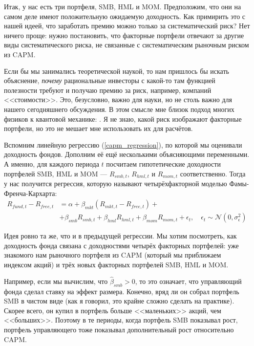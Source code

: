 Итак, у нас есть три портфеля, SMB, HML и MOM. Предположим, что они на самом деле имеют положительную ожидаемую доходность. Как примирить это с нашей идеей, что заработать премию можно только за систематический риск? Нет ничего проще: нужно постановить, что факторные портфели отвечают за другие виды систематического риска, не связанные с систематическим рыночным риском из CAPM.

Если бы мы занимались теоретической наукой, то нам пришлось бы искать объяснение, \emph{почему} рациональные инвесторы с какой-то там функцией полезности требуют и получаю премию за риск, например, компаний <<стоимости>>. Это, безусловно, важно для науки, но не столь важно для нашего сегодняшнего обсуждения. В этом смысле мне близок подход многих физиков к квантовой механике: . Я не знаю, какой риск изображают факторные портфели, но это не мешает мне использовать их для расчётов.

Вспомним линейную регрессию (\ref{capm_regression}), по которой мы оценивали доходность фондов. Дополним её ещё несколькими объясняющими переменными. А именно, для каждого периода $t$ посчитаем гипотетические доходности портфелей SMB, HML и MOM --- $R_{smb,t}$, $R_{hml,t}$ и $R_{mom,t}$ соответственно. Тогда у нас получится регрессия, которую называют четырёхфакторной моделью Фамы-Френча-Кархарта:
\begin{align}
\nonumber
R_{fund,t} - R_{free,t} &= \alpha + \beta_{mkt}\left(R_{mkt,t} - R_{free,t}\right) + \\
&+ \beta_{smb}R_{smb,t} + \beta_{hml}R_{hml,t} + \beta_{mom}R_{mom,t} + \epsilon_t, \quad \epsilon_t \sim \mathcal{N}(0, \sigma_{\epsilon}^2)
\label{four_factor_regression}
\end{align}

Идея ровно та же, что и в предыдущей регрессии. Мы хотим посмотреть, как доходность фонда связана с доходностями четырёх факторных портфелей: уже знакомого нам рыночного портфеля из CAPM (который мы приближаем индексом акций) и трёх новых факторных портфелей SMB, HML и MOM.

Например, если мы вычислим, что $\hat{\beta}_{smb} > 0$, то это означает, что управляющий фонда сделал ставку на эффект размера. Конечно, вряд ли он собрал портфель SMB в чистом виде (как я говорил, это крайне сложно сделать на практике). Скорее всего, он купил в портфель больше <<маленьких>> акций, чем <<больших>>. Поэтому в те периоды, когда портфель SMB показывал рост, портфель управляющего тоже показывал дополнительный рост относительно CAPM.

